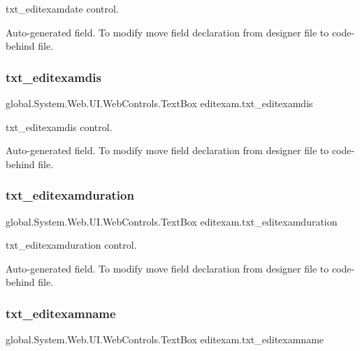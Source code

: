 txt\+\_\+editexamdate control. 

Auto-\/generated field. To modify move field declaration from designer file to code-\/behind file. \mbox{\label{classeditexam_a987cce3dfa50472482bc66cfdb44f481}} 
\subsubsection{\texorpdfstring{txt\_editexamdis}{txt\_editexamdis}}
{\footnotesize\ttfamily global.\+System.\+Web.\+U\+I.\+Web\+Controls.\+Text\+Box editexam.\+txt\+\_\+editexamdis\hspace{0.3cm}{\ttfamily [protected]}}



txt\+\_\+editexamdis control. 

Auto-\/generated field. To modify move field declaration from designer file to code-\/behind file. \mbox{\label{classeditexam_ad8d76cc3c0c1f860541d24483f5f47de}} 
\subsubsection{\texorpdfstring{txt\_editexamduration}{txt\_editexamduration}}
{\footnotesize\ttfamily global.\+System.\+Web.\+U\+I.\+Web\+Controls.\+Text\+Box editexam.\+txt\+\_\+editexamduration\hspace{0.3cm}{\ttfamily [protected]}}



txt\+\_\+editexamduration control. 

Auto-\/generated field. To modify move field declaration from designer file to code-\/behind file. \mbox{\label{classeditexam_a8d63f58e04baa3794dd9e182f40d966b}} 
\subsubsection{\texorpdfstring{txt\_editexamname}{txt\_editexamname}}
{\footnotesize\ttfamily global.\+System.\+Web.\+U\+I.\+Web\+Controls.\+Text\+Box editexam.\+txt\+\_\+editexamname\hspace{0.3cm}{\ttfamily [protected]}}



